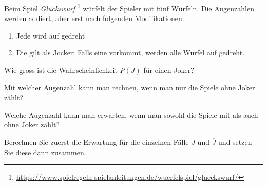 Beim Spiel {\em Glückswurf}\/%
\footnote{\url{https://www.spielregeln-spielanleitungen.de/wuerfelspiel/glueckswurf/}}
würfelt der Spieler mit fünf Würfeln.
Die Augenzahlen werden addiert, aber erst nach folgenden Modifikationen:
\begin{enumerate}
\item Jede  wird auf  gedreht
\item Die  gilt als Jocker: Falls eine  vorkommt,
werden alle Würfel auf  gedreht.
\end{enumerate}
\begin{teilaufgaben}
\item
Wie gross ist die Wahrscheinlichkeit $P(J)$ für einen Joker?
\item
Mit welcher Augenzahl kann man rechnen, wenn man nur die Spiele
ohne Joker zählt?
\item
Welche Augenzahl kann man erwarten, wenn man sowohl die Spiele mit
als auch ohne Joker zählt?
\end{teilaufgaben}

\begin{hinweis}
Berechnen Sie zuerst die Erwartung für die einzelnen Fälle $J$ und
$\overline{J}$ und setzen Sie diese dann zusammen.
\end{hinweis}

